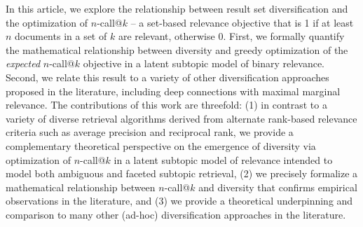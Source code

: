 In this article, we explore the relationship between result set
diversification and the optimization of \mbox{$n$-call@$k$} -- a
set-based relevance objective that is 1 if at least $n$ documents in a
set of $k$ are relevant, otherwise 0.  First, we formally quantify the
mathematical relationship between diversity and greedy optimization of
the \emph{expected} $n$-call@$k$ objective in a latent subtopic model
of binary relevance.  Second, we relate this result to a variety of
other diversification approaches proposed in the literature, including
deep connections with maximal marginal relevance.  The contributions
of this work are threefold: (1) in contrast to a variety of diverse
retrieval algorithms derived from alternate rank-based relevance
criteria such as average precision and reciprocal rank, we provide a
complementary theoretical perspective on the emergence of diversity
via optimization of $n$-call@$k$ in a latent subtopic model of
relevance intended to model both ambiguous and faceted subtopic
retrieval, (2) we precisely formalize a mathematical relationship
between $n$-call@$k$ and diversity that confirms empirical
observations in the literature, and (3) we provide a theoretical
underpinning and comparison to many other (ad-hoc) diversification
approaches in the literature.



